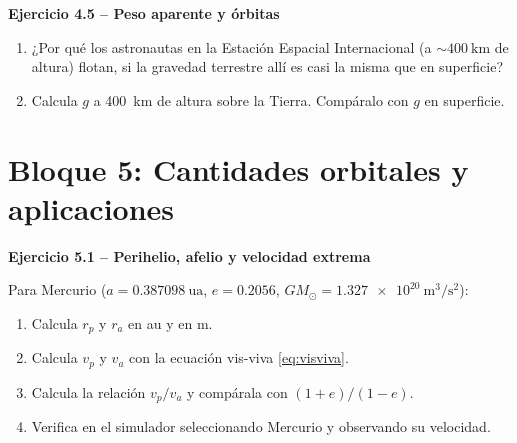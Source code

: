 \documentclass[11pt,a4paper]{article}
\newenvironment{cajaEjercicio}[1][]{\par\medskip\noindent\textbf{#1}\par\smallskip}{\par\medskip}
\theoremstyle{definition}
\newcommand{\GMsun}{\ensuremath{GM_{\odot}}}
\begin{document}
\begin{cajaEjercicio}[Ejercicio 4.5 -- Peso aparente y órbitas]
\begin{enumerate}[label=\alph*),leftmargin=*]
  \item ¿Por qué los astronautas en la Estación Espacial Internacional (a $\sim\SI{400}{\kilo\metre}$ de altura) flotan, si la gravedad terrestre allí es casi la misma que en superficie?
  \item Calcula $g$ a \SI{400}{\kilo\metre} de altura sobre la Tierra. Compáralo con $g$ en superficie.
\end{enumerate}
\end{cajaEjercicio}

\section{Bloque 5: Cantidades orbitales y aplicaciones}

\begin{cajaEjercicio}[Ejercicio 5.1 -- Perihelio, afelio y velocidad extrema]
Para Mercurio ($a = \SI{0.387098}{\astronomicalunit}$, $e=0.2056$, $\GMsun = \SI{1.327e20}{\cubic\metre\per\square\second}$):
\begin{enumerate}[label=\alph*),leftmargin=*]
  \item Calcula $r_{p}$ y $r_{a}$ en \si{\astronomicalunit} y en \si{\metre}.
  \item Calcula $v_{p}$ y $v_{a}$ con la ecuación vis-viva \eqref{eq:visviva}.
  \item Calcula la relación $v_{p}/v_{a}$ y compárala con $(1+e)/(1-e)$.
  \item Verifica en el simulador seleccionando Mercurio y observando su velocidad.
\end{enumerate}
\end{cajaEjercicio}
\end{document}
